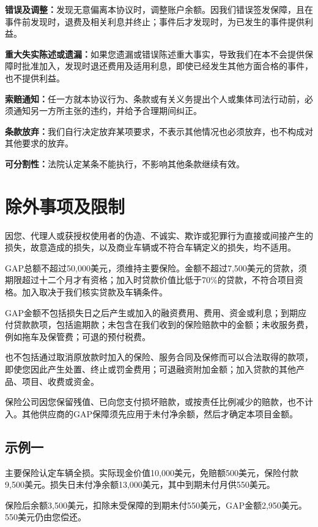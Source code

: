 \documentclass[UTF8,fontset=none,11pt,a4paper]{ctexart}
\begin{document}
\textbf{错误及调整：}发现无意偏离本协议时，调整账户余额。因我们错误签发保障，且在事件前发现时，退费及相关利息并终止；事件后才发现时，为已发生的事件\allowbreak\mbox{提供利益。}


\textbf{重大失实陈述或遗漏：}如果您遗漏或错误陈述重大事实，导致我们在本不会提供保障时批准加入，发现时退还费用及适用利息，即使已经发生其他方面合格的事件，也不\allowbreak\mbox{提供利益。}


\textbf{索赔通知：}任一方就本协议行为、条款或有关义务提出个人或集体司法行动前，必须通知另一方所主张的违约，并给予合理\allowbreak\mbox{期间纠正。}


\textbf{条款放弃：}我们自行决定放弃某项要求，不表示其他情况也必须放弃，也不构成对其他要\allowbreak\mbox{求的放弃。}


\textbf{可分割性：}法院认定某条不能执行，不影响其他条款\allowbreak\mbox{继续有效。}


\section*{除外事项及限制}
因您、代理人或获授权使用者的伪造、不诚实、欺诈或犯罪行为直接或间接产生的损失，故意造成的损失，以及商业车辆或不符合车辆定义的损失，\allowbreak\mbox{均不适用。}


GAP总额不超过50,000美元，须维持主要保险。金额不超过7,500美元的贷款，须期限超过十二个月才有资格；加入时贷款价值比低于70\%的贷款，不符合项目资格。加入取决于我们核实贷款及\allowbreak\mbox{车辆条件。}


GAP金额不包括损失日之后产生或加入的融资费用、费用、资金或利息；到期应付贷款款项，包括逾期款；未包含在我们收到的保险赔款中的金额；未收服务费，例如拖车及保管费；可退的\allowbreak\mbox{预付税费。}


也不包括通过取消原放款时加入的保险、服务合同及保修而可以合法取得的款项，即使您因此产生处置、终止或罚金费用；可退融资附加金额；加入贷款的其他产品、项目、收\allowbreak\mbox{费或资金。}


保险公司因您保留残值、已向您支付损坏赔款，或按责任比例减少的赔款，也不计入。其他供应商的GAP保障须先应用于未付净余额，然后才确定本\allowbreak\mbox{项目金额。}


\subsection*{示例一}
主要保险认定车辆全损。实际现金价值10,000美元，免赔额500美元，保险付款9,500美元。损失日未付净余额13,000美元，其中到期未付月供550美元。


保险后余额3,500美元，扣除未受保障的到期未付550美元，GAP金额2,950美元。550美元仍\allowbreak\mbox{由您偿还。}
\end{document}
